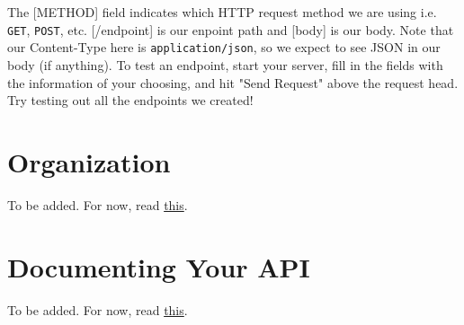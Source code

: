 The [METHOD] field indicates which HTTP request method we are using i.e. \texttt{GET}, \texttt{POST}, etc. [/endpoint] is our enpoint path and [body] is our body. Note that our Content-Type here is \texttt{application/json}, so we expect to see JSON in our body (if anything). To test an endpoint, start your server, fill in the fields with the information of your choosing, and hit "Send Request" above the request head. Try testing out all the endpoints we created!

\section{Organization}
To be added. For now, read \href{https://blog.logrocket.com/organizing-express-js-project-structure-better-productivity}{this}.
\section{Documenting Your API}
To be added. For now, read \href{https://swagger.io/solutions/api-documentation/}{this}.

